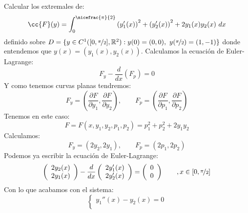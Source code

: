 \begin{ejemplo} %
    Calcular los extremales de:
    \begin{equation*}
        \cc{F}(y) = \int_{0}^{\nicefrac{\pi}{2}} {(y_1'(x))}^{2}+{(y_2'(x))}^{2}+2y_1(x)y_2(x)~dx 
    \end{equation*}
    definido sobre $D=\{y\in C^1([0,\nicefrac{\pi}{2}],\mathbb{R}^2) : y(0) = (0,0),\ y(\nicefrac{\pi}{2}) = (1,-1)\}$ donde entendemos que $y(x) = (y_1(x),y_2(x))$. Calculamos la ecuación de Euler-Lagrange:
    \begin{equation*}
        F_y - \frac{d}{dx}(F_p) = 0
    \end{equation*}
    Y como tenemos curvas planas tendremos:
    \begin{equation*}
        F_y = \left(\frac{\partial F}{\partial y_1},\frac{\partial F}{\partial y_2}\right), \qquad F_p = \left(\frac{\partial F}{\partial p_1},\frac{\partial F}{\partial p_2}\right)
    \end{equation*}
    Tenemos en este caso:
    \begin{equation*}
        F=F(x,y_1,y_2,p_1,p_2) = p_1^2 + p_2^2 + 2y_1y_2
    \end{equation*}
    Calculamos:
    \begin{equation*}
        F_y = (2y_2, 2y_1), \qquad F_p = (2p_1, 2p_2)
    \end{equation*}
    Podemos ya escribir la ecuación de Euler-Lagrange:
    \begin{equation*}
        \left(\begin{array}{cc}
            2y_2(x) \\
            2y_1(x)
        \end{array}\right) - \frac{d}{dx}\left(\begin{array}{cc}
             2y_1'(x)\\
             2y_2'(x)
        \end{array}\right) = \left(\begin{array}{cc}
            0 \\
            0 
        \end{array}\right) \qquad,  x\in [0,\nicefrac{\pi}{2}]
    \end{equation*}
    Con lo que acabamos con el sistema:
    \begin{equation*}
        \left\{\begin{array}{l}
            y_1''(x) - y_2(x) = 0 \\

\end{array}
\end{equation*}
\end{ejemplo}
